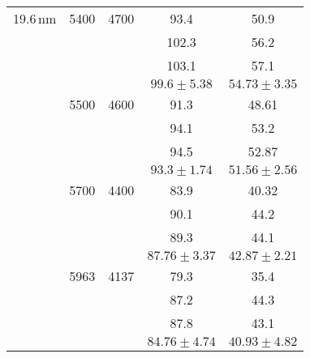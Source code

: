 \documentclass{article}
\begin{document}
\begin{table}
\begin{tabular}{|c|c|c|c|c|}
        19.6\,nm & 5400    &  4700      & 93.4     &   50.9   \\
                 &         &            & 102.3    &   56.2   \\
                 &         &            & 103.1    &   57.1   \\
    \hline
                 &         &            & $99.6 \pm 5.38$ & $54.73 \pm 3.35$ \\  
    \hline
                 & 5500    &  4600      & 91.3    &   48.61  \\
                 &         &            & 94.1    &   53.2   \\
                 &         &            & 94.5    &   52.87  \\
    \hline
                 &         &            & $93.3 \pm 1.74$   & $51.56 \pm 2.56$  \\
    \hline
                 & 5700    &  4400      & 83.9     &  40.32  \\
                 &         &            & 90.1     &  44.2   \\
                 &         &            & 89.3     &  44.1   \\
    \hline
                 &         &            & $87.76 \pm 3.37$   & $42.87 \pm 2.21$  \\
    \hline
                 &  5963   &  4137      & 79.3     &  35.4 \\
                 &         &            & 87.2     &  44.3 \\
                 &         &            & 87.8     &  43.1 \\
    \hline
                 &         &            & $84.76 \pm 4.74$  & $40.93 \pm 4.82$ \\
    \hline
     \end{tabular}
\end{table}


     
\end{document}
